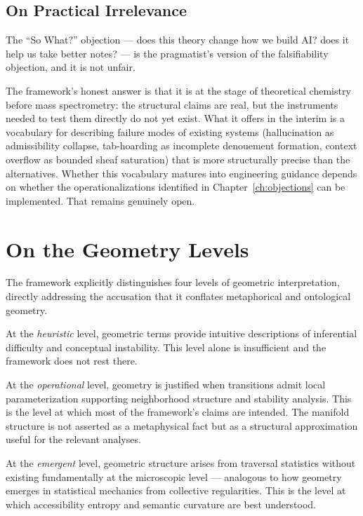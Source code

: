 \documentclass[12pt,oneside]{book}
\theoremstyle{plain}
\theoremstyle{definition}
\theoremstyle{plain}
\begin{document}
\subsection{On Practical Irrelevance}

The ``So What?'' objection — does this theory change how we build AI? does it help us take better notes? — is the pragmatist's version of the falsifiability objection, and it is not unfair.

The framework's honest answer is that it is at the stage of theoretical chemistry before mass spectrometry: the structural claims are real, but the instruments needed to test them directly do not yet exist. What it offers in the interim is a vocabulary for describing failure modes of existing systems (hallucination as admissibility collapse, tab-hoarding as incomplete denouement formation, context overflow as bounded sheaf saturation) that is more structurally precise than the alternatives. Whether this vocabulary matures into engineering guidance depends on whether the operationalizations identified in Chapter~\ref{ch:objections} can be implemented. That remains genuinely open.

\section{On the Geometry Levels}

The framework explicitly distinguishes four levels of geometric interpretation, directly addressing the accusation that it conflates metaphorical and ontological geometry.

At the \emph{heuristic} level, geometric terms provide intuitive descriptions of inferential difficulty and conceptual instability. This level alone is insufficient and the framework does not rest there.

At the \emph{operational} level, geometry is justified when transitions admit local parameterization supporting neighborhood structure and stability analysis. This is the level at which most of the framework's claims are intended. The manifold structure is not asserted as a metaphysical fact but as a structural approximation useful for the relevant analyses.

At the \emph{emergent} level, geometric structure arises from traversal statistics without existing fundamentally at the microscopic level — analogous to how geometry emerges in statistical mechanics from collective regularities. This is the level at which accessibility entropy and semantic curvature are best understood.
\end{document}
